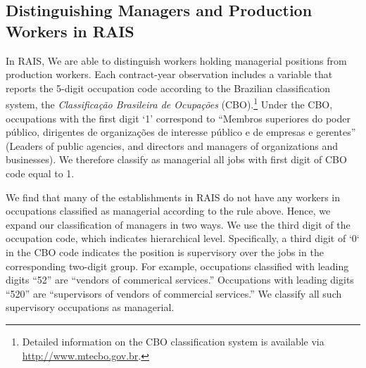 \subsection{Distinguishing Managers and Production Workers in RAIS}
In RAIS, We are able to distinguish workers holding managerial positions from production workers.
Each contract-year observation includes a variable that reports the 5-digit occupation code according to the Brazilian classification system, the \emph{Classificaç{\~a}o Brasileira de Ocupaç{\~o}es} (CBO).\footnote{Detailed information on the CBO classification system is available via \href{http://www.mtecbo.gov.br}{http://www.mtecbo.gov.br}.} 
Under the CBO, occupations with the first digit `1' correspond to  ``Membros superiores do poder p\'{u}blico, dirigentes de organiza\c{c}\~{o}es
 de interesse p\'{u}blico e de empresas e gerentes'' (Leaders of public agencies, and directors and managers of organizations and businesses). We therefore classify as managerial all jobs with first digit of CBO code equal to 1.

 We find that many of the establishments in RAIS do not have any workers in occupations classified as managerial according to the rule above. Hence, we expand our classification of managers in two ways.  We use the third digit of the occupation code, which indicates hierarchical level. Specifically, a third digit of `0` in the CBO code indicates the position is supervisory over the jobs in the corresponding two-digit group. For example, occupations classified with leading digits ``52'' are ``vendors of commerical services.'' Occupations with leading digits ``520'' are ``supervisors of vendors of commercial services.'' We classify all such supervisory occupations as managerial. %
  
   
 


